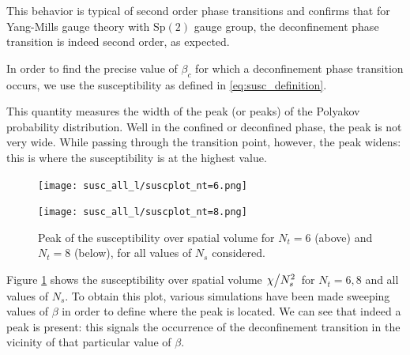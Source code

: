 \documentclass[reqno,12pt]{article}
\numberwithin{equation}{section}
\newcommand{\Sp}{\mathrm{Sp}}
\begin{document}
This behavior is typical of second order phase transitions and confirms that for Yang-Mills gauge theory with $\Sp(2)$
gauge group, the deconfinement phase transition is indeed second order, as expected. 

In order to find the precise value of $\beta_c$ for which a deconfinement phase transition occurs, we use
the susceptibility as defined in \eqref{eq:susc_definition}.

This quantity measures the width of the peak (or peaks) of the Polyakov probability distribution. Well in the
confined or deconfined phase, the peak is not very wide. While passing through the transition point, however,
the peak widens: this is where the susceptibility is at the highest value. 

\begin{figure}[h]
	\centering
		\texttt{[image: susc\_all\_l/suscplot\_nt=6.png]} 

		\texttt{[image: susc\_all\_l/suscplot\_nt=8.png]}	
	\caption[Susceptibility peaks for $N_t = 6, 8$]{Peak of the susceptibility over spatial volume for
	$N_t = 6$ (above) and $N_t = 8$ (below), for all values of $N_s$ considered. }
	\label{fig:susc_peaks}
\end{figure}

Figure \ref{fig:susc_peaks} shows the susceptibility over spatial volume 
$\flatfrac{\chi}{N_s^2}$ for $N_t = 6, 8$ and all values of $N_s$. To obtain this plot, various
simulations have been made sweeping values of $\beta$ in order to define where the peak is located. We can see
that indeed a peak is present: this signals the occurrence of the deconfinement transition in the vicinity of that
particular value of $\beta$. 
\end{document}
